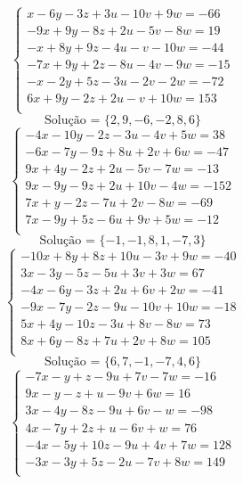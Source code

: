 \documentclass[12pt,oneside,a4paper]{article}
\begin{document}
\vspace{\baselineskip}
\begin{equation*}
\begin{cases}
x-6y-3z+3u-10v+9w=-66 \\
-9x+9y-8z+2u-5v-8w=19 \\
-x+8y+9z-4u-v-10w=-44 \\
-7x+9y+2z-8u-4v-9w=-15 \\
-x-2y+5z-3u-2v-2w=-72 \\
6x+9y-2z+2u-v+10w=153 \\
\end{cases}
\end{equation*}
\begin{equation*}
\text{Solução = }\{2,9,-6,-2,8,6\}
\end{equation*}
\vspace{\baselineskip}
\begin{equation*}
\begin{cases}
-4x-10y-2z-3u-4v+5w=38 \\
-6x-7y-9z+8u+2v+6w=-47 \\
9x+4y-2z+2u-5v-7w=-13 \\
9x-9y-9z+2u+10v-4w=-152 \\
7x+y-2z-7u+2v-8w=-69 \\
7x-9y+5z-6u+9v+5w=-12 \\
\end{cases}
\end{equation*}
\begin{equation*}
\text{Solução = }\{-1,-1,8,1,-7,3\}
\end{equation*}
\vspace{\baselineskip}
\begin{equation*}
\begin{cases}
-10x+8y+8z+10u-3v+9w=-40 \\
3x-3y-5z-5u+3v+3w=67 \\
-4x-6y-3z+2u+6v+2w=-41 \\
-9x-7y-2z-9u-10v+10w=-18 \\
5x+4y-10z-3u+8v-8w=73 \\
8x+6y-8z+7u+2v+8w=105 \\
\end{cases}
\end{equation*}
\begin{equation*}
\text{Solução = }\{6,7,-1,-7,4,6\}
\end{equation*}
\vspace{\baselineskip}
\begin{equation*}
\begin{cases}
-7x-y+z-9u+7v-7w=-16 \\
9x-y-z+u-9v+6w=16 \\
3x-4y-8z-9u+6v-w=-98 \\
4x-7y+2z+u-6v+w=76 \\
-4x-5y+10z-9u+4v+7w=128 \\
-3x-3y+5z-2u-7v+8w=149 \\
\end{cases}
\end{equation*}
\end{document}
